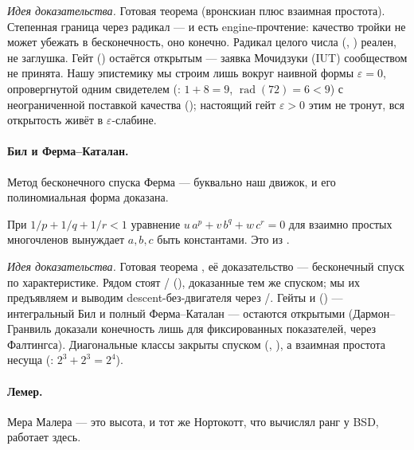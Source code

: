 \emph{Идея доказательства.} Готовая теорема  (вронскиан плюс взаимная простота).
Степенная граница через радикал — и есть engine-прочтение: качество тройки не может убежать в
бесконечность, оно конечно. Радикал целого числа (, ) реален, не
заглушка. Гейт  (\red{}) остаётся открытым — заявка Мочидзуки (IUT) сообществом
не принята. Нашу эпистемику мы строим лишь вокруг наивной формы $\varepsilon=0$, опровергнутой одним
свидетелем (: $1+8=9$, $\operatorname{rad}(72)=6<9$) с
неограниченной поставкой качества (); настоящий гейт
$\varepsilon>0$ этим не тронут, вся открытость живёт в $\varepsilon$-слабине.

\paragraph{Бил и Ферма–Каталан.}
Метод бесконечного спуска Ферма — буквально наш движок, и его полиномиальная форма доказана.

\begin{theorem}\label{thm:polynomial_fermat_catalan_shadow}
\green{} При $1/p+1/q+1/r<1$ уравнение $u\,a^p+v\,b^q+w\,c^r=0$ для взаимно простых многочленов
вынуждает $a,b,c$ быть константами. Это  из .
\end{theorem}

\emph{Идея доказательства.} Готовая теорема , её доказательство — бесконечный спуск по
характеристике. Рядом стоят / (),
доказанные тем же спуском; мы их предъявляем и выводим descent-без-двигателя через
/. Гейты  и 
(\red{}) — интегральный Бил и полный Ферма–Каталан — остаются открытыми (Дармон–Гранвиль доказали
конечность лишь для фиксированных показателей, через Фалтингса). Диагональные классы закрыты спуском
(, ), а взаимная
простота несуща (: $2^3+2^3=2^4$).

\paragraph{Лемер.}
Мера Малера — это высота, и тот же Нортокотт, что вычислял ранг у BSD, работает здесь.

